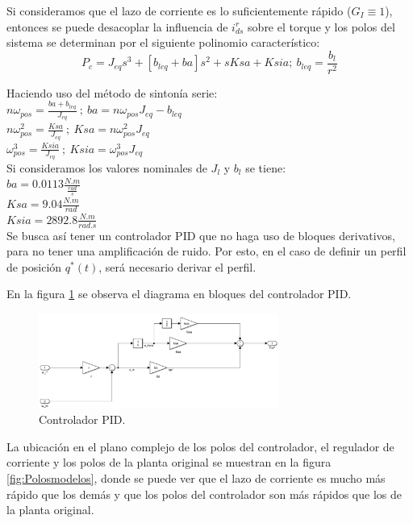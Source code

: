 \documentclass[10pt]{article}
\begin{document}
	Si consideramos que el lazo de corriente es lo suficientemente rápido ($G_{I}\equiv 1$), entonces se puede desacoplar la influencia de $i^{r}_{ds}$ sobre el torque y los polos del sistema se determinan por el siguiente polinomio característico:
	\begin{equation}
	P_{c}=J_{eq}s^{3}+[b_{leq}+ba]s^{2}+sKsa+Ksia; \ b_{leq}= \frac{b_{l}}{r^{2}} 
	\label{eq:2.1.2.q.7}
	\end{equation}
	
	Haciendo uso del método de sintonía serie:\\
	$ n\omega_{pos}=\frac{ba+b_{leq}}{J_{eq}} \ ; \ ba=n\omega_{pos}J_{eq}-b_{leq}$ \\
	$ n\omega^{2}_{pos}=\frac{Ksa}{J_{eq}} \ ; \  Ksa=n\omega^{2}_{pos}J_{eq} $\\
	$ \omega^{3}_{pos}=\frac{Ksia}{J_{eq}} \ ; \  Ksia=\omega^{3}_{pos}J_{eq} $\\
	
	Si consideramos los valores nominales de $J_{l}$ y $b_{l}$ se tiene:\\
	$ba=0.0113 \frac{N.m}{\frac{rad}{s}}$\\
	$Ksa=9.04 \frac{N.m}{rad}$\\
	$Ksia=2892.8 \frac{N.m}{rad.s}$\\
	
	Se busca así tener un controlador PID que no haga uso de bloques derivativos, para no tener una amplificación de ruido. Por esto, en el caso de definir un perfil de posición $q^{*}(t)$, será necesario derivar el perfil.
	
	En la figura \ref{fig:controladorPID} se observa el diagrama en bloques del controlador PID.
		 	\begin{figure}[h!]
	\centering
	\includegraphics[width=0.7\textwidth]{controladorPID.png}
	\caption{\label{fig:controladorPID}Controlador PID.}
	\end{figure}
	La ubicación en el plano complejo de los polos del controlador, el regulador de corriente y los polos de la planta original se muestran en la figura \ref{fig:Polosmodelos}, donde se puede ver que el lazo de corriente es mucho más rápido que los demás y que los polos del controlador son más rápidos que los de la planta original.
	
\end{document}
